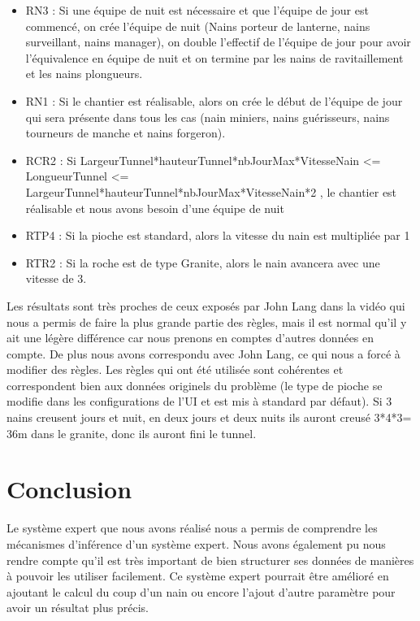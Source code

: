 \documentclass[a4paper,10pt]{report}
\begin{document}
 \begin{itemize}
      \item RN3 : Si une équipe de nuit est nécessaire et que l'équipe de jour est commencé, 
      on crée l'équipe de nuit (Nains porteur de lanterne, nains surveillant, nains manager), 
      on double l'effectif de l'équipe de jour pour avoir l'équivalence en équipe de nuit 
      et on termine par les nains de ravitaillement et les nains plongueurs. 

      \item RN1 : Si le chantier est réalisable, alors on crée le début de l'équipe de jour qui sera présente dans tous les cas 
      (nain miniers, nains guérisseurs, nains tourneurs de manche et nains forgeron).

      \item RCR2 : Si LargeurTunnel*hauteurTunnel*nbJourMax*VitesseNain <= LongueurTunnel <= LargeurTunnel*hauteurTunnel*nbJourMax*VitesseNain*2 , 
	le chantier est réalisable et nous avons besoin d'une équipe de nuit

      \item RTP4 : Si la pioche est standard, alors la vitesse du nain est multipliée par 1

      \item RTR2 : Si la roche est de type Granite, alors le nain avancera avec une vitesse de 3.
\end{itemize}
  Les résultats sont très proches de ceux exposés par John Lang dans la vidéo qui nous a permis de faire la plus grande partie des règles, mais il est normal qu'il
  y ait une légère différence car nous prenons en comptes d'autres données en compte. De plus nous avons correspondu avec John Lang, ce qui nous a forcé à modifier
  des règles. Les règles qui ont été utilisée sont cohérentes et correspondent bien aux données originels du problème (le type de pioche se modifie dans les configurations
  de l'UI et est mis à standard par défaut).
  Si 3 nains creusent jours et nuit, en deux jours et deux nuits ils auront creusé 3*4*3= 36m dans le granite, donc ils auront fini le tunnel.
   
\chapter*{Conclusion}

  Le système expert que nous avons réalisé nous a permis de comprendre les mécanismes d'inférence d'un système expert. Nous avons également pu nous rendre compte
  qu'il est très important de bien structurer ses données de manières à pouvoir les utiliser facilement. Ce système expert pourrait être amélioré en ajoutant 
  le calcul du coup d'un nain ou encore l'ajout d'autre paramètre pour avoir un résultat plus précis.
  
\end{document}
